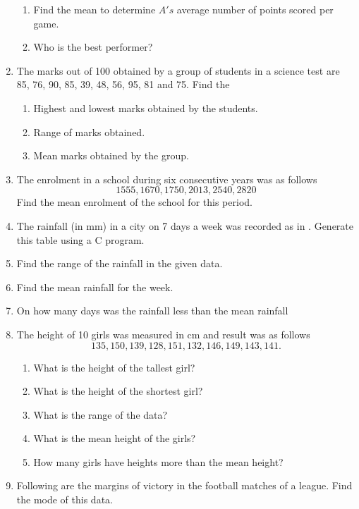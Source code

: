 \begin{enumerate}[label=\thesection.\arabic*, ref=\thesection.\theenumi]
\begin{enumerate}
	\item Find the mean to determine $A's$ average number of points scored per game.
	\item Who is the best performer?
\end{enumerate}
\item The marks out of 100 obtained by a group of students in a science test are 85, 76, 90, 85, 39, 48, 56, 95, 81 and 75.  Find the 
	\begin{enumerate}
		\item Highest and lowest marks obtained by the students.
		\item Range of marks obtained.
		\item  Mean marks obtained by the group.
	\end{enumerate}
\item The enrolment in a school during six consecutive years was as follows  
	$$1555, 1670, 1750, 2013, 2540, 2820$$
	Find the mean enrolment of the school for this period.
\item The rainfall (in mm) in a city on 7 days a week was recorded as in 
  .  Generate this table using a C program.
	\begin{table}[H]
  \centering
  
  \caption{}
  \label{tab:rainfall}
\end{table}
\item Find the range of the rainfall in the given data.
\item Find the mean rainfall for the week.
\item On how many days was the rainfall less than the mean rainfall 
\item The height of 10 girls was measured in cm and result was as follows
	$$135, 150, 139, 128, 151, 132, 146, 149, 143, 141.$$
	\begin{enumerate}
		\item What is the height of the tallest girl?
		\item What is the height of the shortest girl?
		\item What is the range of the data?
		\item What is the mean height of the girls?
		\item How many girls have heights more than the mean height?
	\end{enumerate}
\item Following are the margins of victory in the football matches of a league.  Find the mode of this data.
	\begin{gather*}

\end{gather*}
\end{enumerate}
